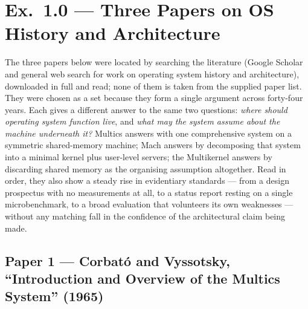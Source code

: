 \section*{Ex.\ 1.0 --- Three Papers on OS History and Architecture}

The three papers below were located by searching the literature (Google Scholar and
general web search for work on operating system history and architecture), downloaded in
full and read; none of them is taken from the supplied paper list. They were chosen as a
set because they form a single argument across forty-four years. Each gives a different
answer to the same two questions: \emph{where should operating system function live}, and
\emph{what may the system assume about the machine underneath it?} Multics answers with one
comprehensive system on a symmetric shared-memory machine; Mach answers by decomposing that
system into a minimal kernel plus user-level servers; the Multikernel answers by discarding
shared memory as the organising assumption altogether. Read in order, they also show a
steady rise in evidentiary standards --- from a design prospectus with no measurements at
all, to a status report resting on a single microbenchmark, to a broad evaluation that
volunteers its own weaknesses --- without any matching fall in the confidence of the
architectural claim being made.

\subsection*{Paper 1 --- Corbat\'o and Vyssotsky, ``Introduction and Overview of the Multics System'' (1965)}
\label{p4:sec:multics}

